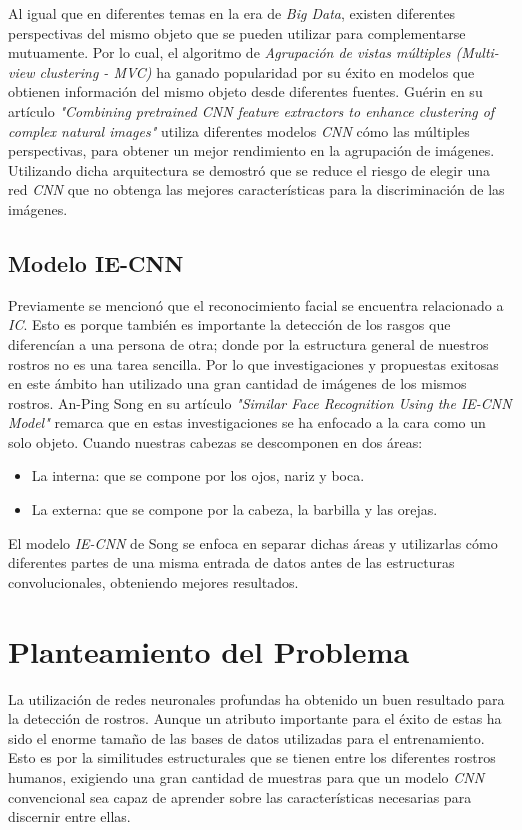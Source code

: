 \documentclass[a4paper, 10pt, conference]{ieeeconf}      %
\begin{document}
    \newline
    Al igual que en diferentes temas en la era de \textit{Big Data}, existen
    diferentes perspectivas del mismo objeto que se pueden utilizar para complementarse
    mutuamente. Por lo cual, el algoritmo de
    \textit{Agrupación de vistas múltiples (Multi-view clustering - MVC)} ha ganado
    popularidad por su éxito en modelos que obtienen información del mismo objeto
    desde diferentes fuentes. \cite{Yang2018} Guérin en su artículo
    \textit{"Combining pretrained CNN feature extractors to enhance clustering of complex natural images"}
    utiliza diferentes modelos \textit{CNN} cómo las múltiples perspectivas, para obtener
    un mejor rendimiento en la agrupación de imágenes. Utilizando dicha arquitectura
    se demostró que se reduce el riesgo de elegir una red \textit{CNN} que no
    obtenga las mejores características para la discriminación de las imágenes.
    \cite{CombiningCNN}


    \subsection{Modelo IE-CNN}
    Previamente se mencionó que el reconocimiento facial se encuentra relacionado
    a \textit{IC}. Esto es porque también es importante la detección de los rasgos
    que diferencían a una persona de otra; donde por la estructura general de nuestros
    rostros no es una tarea sencilla. Por lo que investigaciones y propuestas exitosas
    en este ámbito han utilizado una gran cantidad de imágenes de los mismos rostros.
    An-Ping Song en su artículo \textit{"Similar Face Recognition Using the IE-CNN Model"}
    remarca que en estas investigaciones se ha enfocado a la cara como un solo objeto.
    Cuando nuestras cabezas se descomponen en dos áreas:
    \begin{itemize}
        \item La interna: que se compone por los ojos, nariz y boca.
        \item La externa: que se compone por la cabeza, la barbilla y las orejas.
    \end{itemize}
    El modelo \textit{IE-CNN} de Song se enfoca en separar dichas áreas y utilizarlas
    cómo diferentes partes de una misma entrada de datos antes de las estructuras
    convolucionales, obteniendo mejores resultados. \cite{IECNN}

    \section{Planteamiento del Problema}
    La utilización de redes neuronales profundas ha obtenido un buen resultado
    para la detección de rostros. Aunque un atributo importante para el éxito de
    estas ha sido el enorme tamaño de las bases de datos utilizadas para el
    entrenamiento. Esto es por la similitudes estructurales que se tienen entre
    los diferentes rostros humanos, exigiendo una gran cantidad de muestras para
    que un modelo \textit{CNN} convencional sea capaz de aprender
    sobre las características necesarias para discernir entre ellas.
\end{document}
